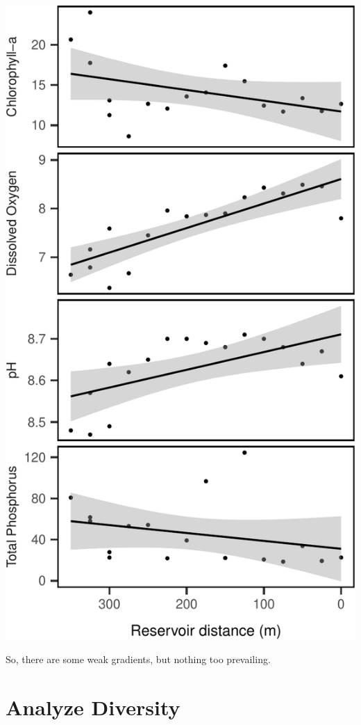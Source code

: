 \documentclass[]{article}
\begin{document}
\begin{center}\includegraphics{ReservoirGradient_files/figure-latex/env_plot-1} \end{center}

So, there are some weak gradients, but nothing too prevailing.

\section{Analyze Diversity}\label{analyze-diversity}
\end{document}
